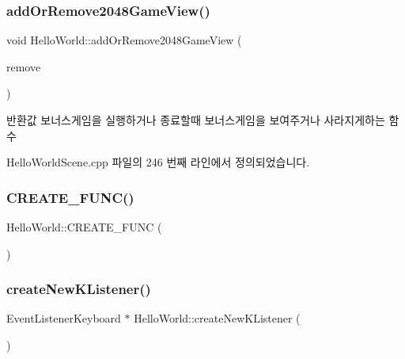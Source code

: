 \subsubsection{\texorpdfstring{add\+Or\+Remove2048\+Game\+View()}{addOrRemove2048GameView()}}
{\footnotesize\ttfamily void Hello\+World\+::add\+Or\+Remove2048\+Game\+View (\begin{DoxyParamCaption}\item[{bool}]{remove }\end{DoxyParamCaption})\hspace{0.3cm}{\ttfamily [protected]}}

\begin{DoxyReturn}{반환값}
보너스게임을 실행하거나 종료할때 보너스게임을 보여주거나 사라지게하는 함수 
\end{DoxyReturn}


Hello\+World\+Scene.\+cpp 파일의 246 번째 라인에서 정의되었습니다.

\mbox{\label{class_hello_world_a857ebfbc49f3a7f81772bee4991d186b}} 
\subsubsection{\texorpdfstring{C\+R\+E\+A\+T\+E\+\_\+\+F\+U\+N\+C()}{CREATE\_FUNC()}}
{\footnotesize\ttfamily Hello\+World\+::\+C\+R\+E\+A\+T\+E\+\_\+\+F\+U\+NC (\begin{DoxyParamCaption}\item[{\hyperlink{class_hello_world}{Hello\+World}}]{ }\end{DoxyParamCaption})}

\mbox{\label{class_hello_world_ab43ad3eb748cab6180daf5a8cfdcf207}} 
\subsubsection{\texorpdfstring{create\+New\+K\+Listener()}{createNewKListener()}}
{\footnotesize\ttfamily Event\+Listener\+Keyboard $\ast$ Hello\+World\+::create\+New\+K\+Listener (\begin{DoxyParamCaption}{ }\end{DoxyParamCaption})\hspace{0.3cm}{\ttfamily [protected]}}

